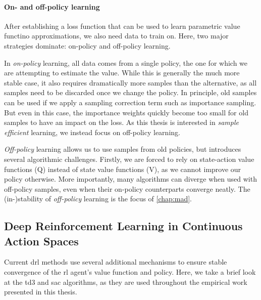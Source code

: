 \paragraph{On- and off-policy learning}

After establishing a loss function that can be used to learn parametric value functino approximations, we also need data to train on.
Here, two major strategies dominate: on-policy and off-policy learning.

In \emph{on-policy} learning, all data comes from a single policy, the one for which we are attempting to estimate the value.
While this is generally the much more stable case, it also requires dramatically more samples than the alternative, as all samples need to be discarded once we change the policy.
In principle, old samples can be used if we apply a sampling correction term such as importance sampling.
But even in this case, the importance weights quickly become too small for old samples to have an impact on the loss.
As this thesis is interested in \emph{sample efficient} learning, we instead focus on off-policy learning.

\emph{Off-policy} learning allows us to use samples from old policies, but introduces several algorithmic challenges.
Firstly, we are forced to rely on state-action value functions (Q) instead of state value functions (V), as we cannot improve our policy otherwise.
More importantly, many algorithms can diverge when used with off-policy samples, even when their on-policy counterparts converge neatly.
The (in-)stability of \emph{off-policy} learning is the focus of \autoref{chap:mad}.

\subsection{Deep Reinforcement Learning in Continuous Action Spaces}


Current \ac{drl} methods use several additional mechanisms to ensure stable convergence of the \ac{rl} agent's value function and policy.
Here, we take a brief look at the \ac{td3} and \ac{sac} algorithms, as they are used throughout the empirical work presented in this thesis.

